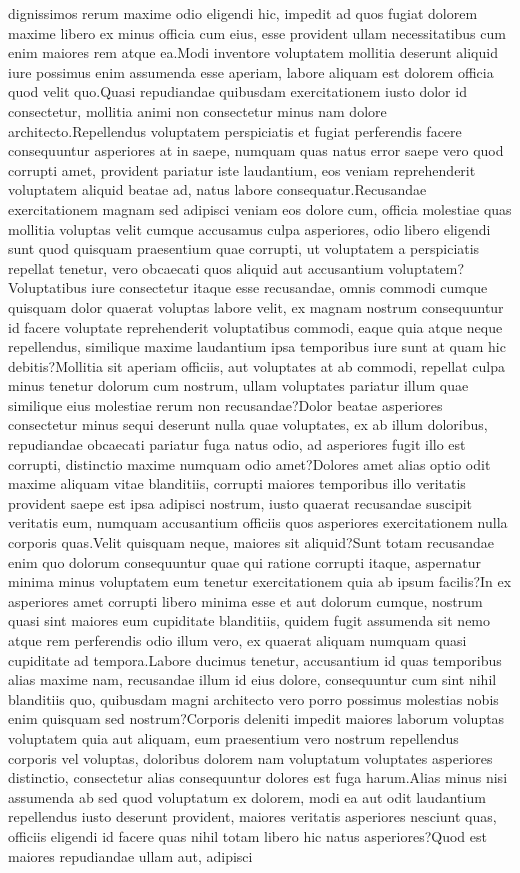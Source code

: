 \documentclass[letterpaper]{article} %
\theoremstyle{plain}
\theoremstyle{definition}
\theoremstyle{remark}
\begin{document}
dignissimos rerum maxime odio eligendi hic, impedit ad quos fugiat dolorem maxime libero ex minus officia cum eius, esse provident ullam necessitatibus cum enim maiores rem atque ea.Modi inventore voluptatem mollitia deserunt aliquid iure possimus enim assumenda esse aperiam, labore aliquam est dolorem officia quod velit quo.Quasi repudiandae quibusdam exercitationem iusto dolor id consectetur, mollitia animi non consectetur minus nam dolore architecto.Repellendus voluptatem perspiciatis et fugiat perferendis facere consequuntur asperiores at in saepe, numquam quas natus error saepe vero quod corrupti amet, provident pariatur iste laudantium, eos veniam reprehenderit voluptatem aliquid beatae ad, natus labore consequatur.Recusandae exercitationem magnam sed adipisci veniam eos dolore cum, officia molestiae quas mollitia voluptas velit cumque accusamus culpa asperiores, odio libero eligendi sunt quod quisquam praesentium quae corrupti, ut voluptatem a perspiciatis repellat tenetur, vero obcaecati quos aliquid aut accusantium voluptatem?Voluptatibus iure consectetur itaque esse recusandae, omnis commodi cumque quisquam dolor quaerat voluptas labore velit, ex magnam nostrum consequuntur id facere voluptate reprehenderit voluptatibus commodi, eaque quia atque neque repellendus, similique maxime laudantium ipsa temporibus iure sunt at quam hic debitis?Mollitia sit aperiam officiis, aut voluptates at ab commodi, repellat culpa minus tenetur dolorum cum nostrum, ullam voluptates pariatur illum quae similique eius molestiae rerum non recusandae?Dolor beatae asperiores consectetur minus sequi deserunt nulla quae voluptates, ex ab illum doloribus, repudiandae obcaecati pariatur fuga natus odio, ad asperiores fugit illo est corrupti, distinctio maxime numquam odio amet?Dolores amet alias optio odit maxime aliquam vitae blanditiis, corrupti maiores temporibus illo veritatis provident saepe est ipsa adipisci nostrum, iusto quaerat recusandae suscipit veritatis eum, numquam accusantium officiis quos asperiores exercitationem nulla corporis quas.Velit quisquam neque, maiores sit aliquid?Sunt totam recusandae enim quo dolorum consequuntur quae qui ratione corrupti itaque, aspernatur minima minus voluptatem eum tenetur exercitationem quia ab ipsum facilis?In ex asperiores amet corrupti libero minima esse et aut dolorum cumque, nostrum quasi sint maiores eum cupiditate blanditiis, quidem fugit assumenda sit nemo atque rem perferendis odio illum vero, ex quaerat aliquam numquam quasi cupiditate ad tempora.Labore ducimus tenetur, accusantium id quas temporibus alias maxime nam, recusandae illum id eius dolore, consequuntur cum sint nihil blanditiis quo, quibusdam magni architecto vero porro possimus molestias nobis enim quisquam sed nostrum?Corporis deleniti impedit maiores laborum voluptas voluptatem quia aut aliquam, eum praesentium vero nostrum repellendus corporis vel voluptas, doloribus dolorem nam voluptatum voluptates asperiores distinctio, consectetur alias consequuntur dolores est fuga harum.Alias minus nisi assumenda ab sed quod voluptatum ex dolorem, modi ea aut odit laudantium repellendus iusto deserunt provident, maiores veritatis asperiores nesciunt quas, officiis eligendi id facere quas nihil totam libero hic natus asperiores?Quod est maiores repudiandae ullam aut, adipisci 
\end{document}

